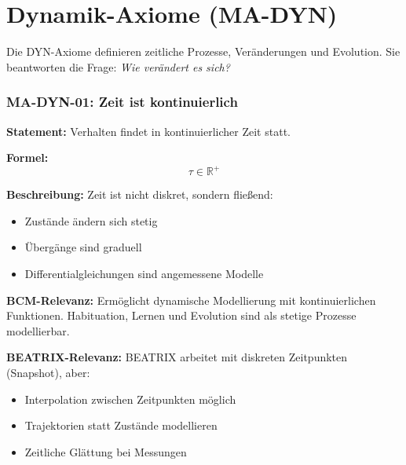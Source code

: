 
\section{Dynamik-Axiome (MA-DYN)}

Die DYN-Axiome definieren zeitliche Prozesse, Veränderungen und Evolution.
Sie beantworten die Frage: \textit{Wie verändert es sich?}


\subsubsection*{MA-DYN-01: Zeit ist kontinuierlich}

\textbf{Statement:} Verhalten findet in kontinuierlicher Zeit statt.

\textbf{Formel:}
\begin{equation}
\tau \in \mathbb{R}^+
\end{equation}

\textbf{Beschreibung:}
Zeit ist nicht diskret, sondern fließend:
\begin{itemize}
    \item Zustände ändern sich stetig
    \item Übergänge sind graduell
    \item Differentialgleichungen sind angemessene Modelle
\end{itemize}

\textbf{BCM-Relevanz:}
Ermöglicht dynamische Modellierung mit kontinuierlichen Funktionen. Habituation, Lernen und Evolution sind als stetige Prozesse modellierbar.

\textbf{BEATRIX-Relevanz:}
BEATRIX arbeitet mit diskreten Zeitpunkten (Snapshot), aber:
\begin{itemize}
    \item Interpolation zwischen Zeitpunkten möglich
    \item Trajektorien statt Zustände modellieren
    \item Zeitliche Glättung bei Messungen
\end{itemize}

